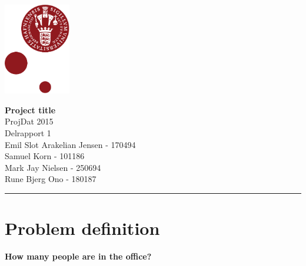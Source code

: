 \documentclass[12pt]{article}
\begin{document}
\begin{minipage}[b]{1.0\linewidth} 
\includegraphics[height=40mm]{KULogo}

\vspace*{-30ex}
\begin{center}
    {\Large \bf Project title} \vspace*{1ex} \\
    {\large ProjDat 2015} \vspace*{1ex} \\
    {\large Delrapport 1} \vspace*{1ex} \\
    {\large Emil Slot Arakelian Jensen - 170494} \vspace*{1ex}\\
    {\large Samuel Korn - 101186} \vspace*{1ex}\\
    {\large Mark Jay Nielsen - 250694} \vspace*{1ex}\\
    {\large Rune Bjerg Ono - 180187} \vspace*{1ex}\\
\end{center}

\vspace*{-3pt}
{\color{KU-red}\hrule}
\end{minipage}










\newpage

\tableofcontents










\newpage
\section{Problem definition}
\textbf{How many people are in the office?}\\
\end{document}

